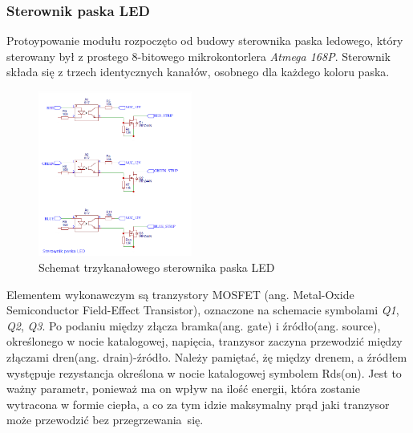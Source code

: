 \documentclass[12pt, eng, twoside, openany, final]{mgr}
\begin{document}
            \subsubsection{Sterownik paska LED}
                Protoypowanie modułu rozpoczęto od budowy sterownika paska ledowego, który sterowany był z prostego 8-bitowego mikrokontorlera \emph{Atmega 168P}. 
                Sterownik składa się z trzech identycznych kanałów, osobnego dla każdego koloru paska. 
                \begin{figure}[H]
                \begin{center}
                    \includegraphics[width=0.45\textwidth]{sterownik.png}
                    \caption{Schemat trzykanałowego sterownika paska LED}
                \end{center}
                \end{figure}
                Elementem wykonawczym są tranzystory MOSFET (ang. Metal-Oxide Semiconductor Field-Effect Transistor), oznaczone na schemacie symbolami \emph{Q1}, \emph{Q2}, \emph{Q3}. Po podaniu między złącza bramka(ang. gate) i źródło(ang. source), określonego w nocie katalogowej, napięcia, tranzysor zaczyna przewodzić między złączami dren(ang. drain)-źródło. Należy pamiętać, żę między drenem, a źródłem występuje rezystancja określona w nocie katalogowej symbolem Rds(on). Jest to ważny parametr, ponieważ ma on wpływ na ilość energii, która zostanie wytracona w formie ciepła, a co za tym idzie maksymalny prąd jaki tranzysor może przewodzić bez przegrzewania~się.
        
                \newpage
        
\end{document}
